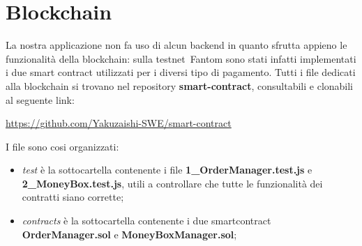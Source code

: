 \section{Blockchain}\label{section:blockchain}

La nostra applicazione non fa uso di alcun backend in quanto sfrutta appieno le funzionalità della blockchain: 
sulla testnet\glo\ Fantom sono stati infatti implementati i due smart contract utilizzati per i diversi tipo di pagamento.
Tutti i file dedicati alla blockchain si trovano nel repository \textbf{smart-contract}, consultabili e clonabili al seguente link:

\begin{center}
    \href{https://github.com/Yakuzaishi-SWE/smart-contract}{https://github.com/Yakuzaishi-SWE/smart-contract}
\end{center}

I file sono cosi organizzati:
\begin{itemize}
    \item \textit{test} è la sottocartella contenente i file \textbf{1\_OrderManager.test.js} e \textbf{2\_MoneyBox.test.js}, utili a controllare che tutte le funzionalità dei contratti siano corrette;
    \item \textit{contracts} è la sottocartella contenente i due smartcontract \textbf{OrderManager.sol} e \textbf{MoneyBoxManager.sol};
\end{itemize}